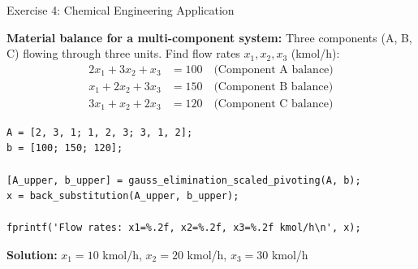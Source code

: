 \documentclass[aspectratio=169]{beamer}
\begin{document}
\begin{frame}[fragile]{Exercise 4: Chemical Engineering Application}
	\vspace{-0.25cm}
	\small{\textbf{Material balance for a multi-component system:}
		\vspace{-0.1cm}
		Three components (A, B, C) flowing through three units. Find flow rates $x_1, x_2, x_3$ (kmol/h):
		\vspace{-0.2cm}
		\begin{align*}
			2x_1 + 3x_2 + x_3 & = 100 \quad \text{(Component A balance)} \\
			x_1 + 2x_2 + 3x_3 & = 150 \quad \text{(Component B balance)} \\
			3x_1 + x_2 + 2x_3 & = 120 \quad \text{(Component C balance)}
		\end{align*}

		\begin{verbatim}
A = [2, 3, 1; 1, 2, 3; 3, 1, 2];
b = [100; 150; 120];

[A_upper, b_upper] = gauss_elimination_scaled_pivoting(A, b);
x = back_substitution(A_upper, b_upper);

fprintf('Flow rates: x1=%.2f, x2=%.2f, x3=%.2f kmol/h\n', x);
    \end{verbatim}
		\vspace{-0.25cm}
		\textbf{Solution:} $x_1 = 10$ kmol/h, $x_2 = 20$ kmol/h, $x_3 = 30$ kmol/h}
\end{frame}
\end{document}
